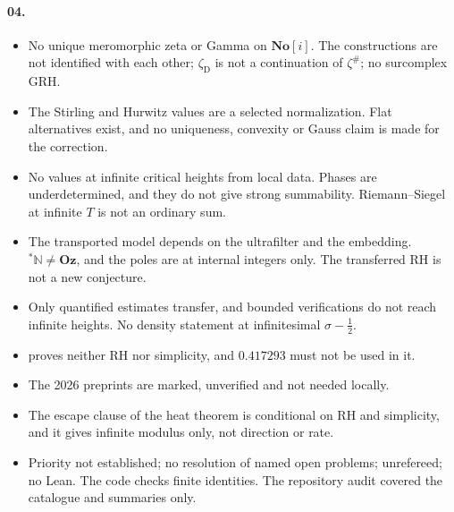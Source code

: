 \documentclass[11pt,a4paper]{article}
\numberwithin{equation}{section}
\theoremstyle{definition}
\theoremstyle{remark}
\newcommand{\No}{\mathbf{No}}
\newcommand{\Oz}{\mathbf{Oz}}
\newcommand{\N}{\mathbb N}
\newcommand{\zD}{\zeta_{\mathrm D}}
\newcommand{\zp}{\zeta^{\#}}
\begin{document}
\paragraph{04.}
\begin{itemize}
\item No unique meromorphic zeta or Gamma on $\No[i]$. The constructions are
 not identified with each other; $\zD$ is not a continuation of $\zp$; no
 surcomplex GRH.
\item The Stirling and Hurwitz values are a selected normalization. Flat
 alternatives exist, and no uniqueness, convexity or Gauss claim is made for
 the correction.
\item No values at infinite critical heights from local data. Phases are
 underdetermined, and they do not give strong summability. Riemann--Siegel
 at infinite $T$ is not an ordinary sum.
\item The transported model depends on the ultrafilter and the embedding.
 ${}^*\N\ne\Oz$, and the poles are at internal integers only. The transferred
 RH is not a new conjecture.
\item Only quantified estimates transfer, and bounded verifications do not
 reach infinite heights. No density statement at infinitesimal
 $\sigma-\tfrac12$.
\item {} proves neither RH nor simplicity, and
 $0.417293$ must not be used in it.
\item The 2026 preprints are marked, unverified and not needed locally.
\item The escape clause of the heat theorem is conditional on RH and
 simplicity, and it gives infinite modulus only, not direction or rate.
\item Priority not established; no resolution of named open problems;
 unrefereed; no Lean. The code checks finite
 identities. The repository audit covered the catalogue and summaries only.
\end{itemize}
\end{document}
